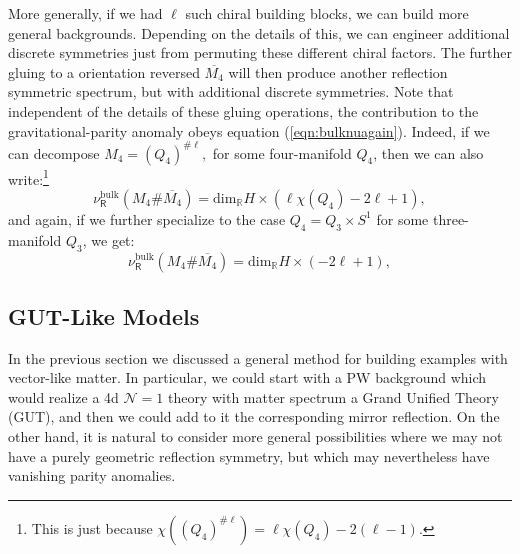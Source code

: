 \documentclass[12pt]{article}%
\numberwithin{equation}{section}
\renewcommand{\(}{\left(}
\renewcommand{\)}{\right)}
\renewcommand{\[}{\left[}
\renewcommand{\]}{\right]}
\begin{document}
More generally, if we had $\ell$ such chiral building blocks, we can build more general backgrounds.
Depending on the details of this, we can engineer additional discrete symmetries just from permuting these different chiral
factors. The further gluing to a orientation reversed $\overline{M_4}$ will then produce another reflection symmetric spectrum, but with additional discrete symmetries. Note that independent of the details of these gluing operations, the contribution to the gravitational-parity anomaly obeys equation (\ref{eqn:bulknuagain}). Indeed, if we can decompose $M_4 = (Q_4)^{\# \ell},$ for some four-manifold $Q_4$,
then we can also write:\footnote{This is just because $\chi((Q_4)^{\# \ell}) = \ell \chi(Q_4) - 2 (\ell - 1)$.}
\begin{equation}
\nu^{\mathrm{bulk}}_{\mathsf{R}}(M_4 \# \overline{M_4}) = \mathrm{dim}_{\mathbb{R}} H \times (\ell \chi(Q_4) - 2\ell + 1),
\end{equation}
and again, if we further specialize to the case $Q_4 = Q_3 \times S^1$ for some three-manifold $Q_3$, we get:
\begin{equation}
\nu^{\mathrm{bulk}}_{\mathsf{R}}(M_4 \# \overline{M_4}) = \mathrm{dim}_{\mathbb{R}} H \times (- 2\ell + 1),
\end{equation}

\subsection{GUT-Like Models}

In the previous section we discussed a general method for building examples with vector-like matter.
In particular, we could start with a PW background which would realize a 4d $\mathcal{N} = 1$ theory
with matter spectrum a Grand Unified Theory (GUT), and then we could add to it the corresponding mirror reflection. On the other hand,
it is natural to consider more general possibilities where we may not have a purely geometric reflection symmetry, but which may nevertheless have vanishing parity anomalies.
\end{document}
